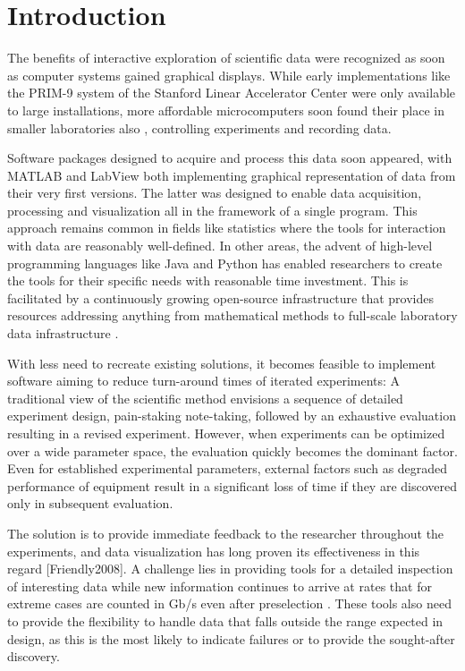 \section{Introduction} \label{introduction}

The benefits of interactive exploration of scientific data were recognized as soon as computer systems gained graphical displays. While early implementations like the PRIM-9 system \citep{prim9} of the Stanford Linear Accelerator Center were only available to large installations, more affordable microcomputers soon found their place in smaller laboratories also \citep{Byrd79,Reed80}, controlling experiments and recording data.

Software packages designed to acquire and process this data soon appeared, with MATLAB \citep{matlab} and LabView \citep{labview} both implementing graphical representation of data from their very first versions. The latter was designed to enable data acquisition, processing and visualization all in the framework of a single program. This approach remains common in fields like statistics where the tools for interaction with data are reasonably well-defined. In other areas, the advent of high-level programming languages like Java and Python has enabled researchers to create the tools for their specific needs with reasonable time investment. This is facilitated by a continuously growing open-source infrastructure that provides resources addressing anything from mathematical methods \citep{numpy2020} to full-scale laboratory data infrastructure \citep{Johnson2015, Koerner2019}.

With less need to recreate existing solutions, it becomes feasible to implement software aiming to reduce turn-around times of iterated experiments: A traditional view of the scientific method envisions a sequence of detailed experiment design, pain-staking note-taking, followed by an exhaustive evaluation resulting in a revised experiment. However, when experiments can be optimized over a wide parameter space, the evaluation quickly becomes the dominant factor. Even for established experimental parameters, external factors such as degraded performance of equipment result in a significant loss of time if they are discovered only in subsequent evaluation.

The solution is to provide immediate feedback to the researcher throughout the experiments, and data visualization has long proven its effectiveness in this regard [Friendly2008]. A challenge lies in providing tools for a detailed inspection of interesting data while new information continues to arrive at rates that for extreme cases are counted in Gb/s even after preselection \citep{LHC}. These tools also need to provide the flexibility to handle data that falls outside the range expected in design, as this is the most likely to indicate failures or to provide the sought-after discovery.


